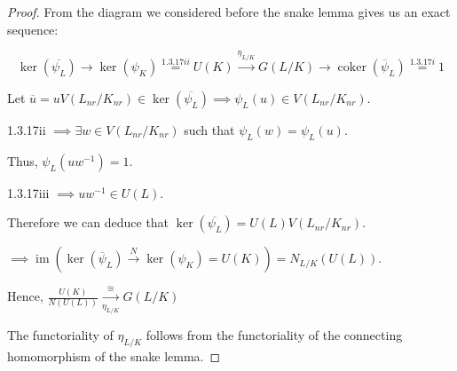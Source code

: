 \documentclass{article}
\theoremstyle{definition}
\numberwithin{theorem}{subsection}
\begin{document}
    \begin{proof}
        From the diagram we considered before the snake lemma gives us an exact sequence:

        \begin{center}
        \end{center}

        \[
            \ker(\overline{\psi_L}) \to \ker(\psi_K) \overset{1.3.17ii}{=} U(K) \xrightarrow{\eta_{L / K}} G(L / K) \to \operatorname{coker} (\overline{\psi}_L) \overset{1.3.17i}{=} 1
        \]

        Let \(\overline{u} = u V(L_{nr} / K_{nr}) \in \ker (\overline{\psi_L}) \implies \psi_L(u) \in V(L_{nr} / K_{nr})\).
        
        1.3.17ii \(\implies \exists w\in V(L_{nr} / K_{nr})\) such that \(\psi_L(w) = \psi_L(u)\).
        
        Thus, \(\psi_L(u w ^{-1}) = 1\).
        
        1.3.17iii \(\implies u w ^{-1} \in U(L)\).

        Therefore we can deduce that \(\ker(\overline{\psi_L}) = U(L) V(L_{nr} / K_{nr})\).
        
        \(\implies \operatorname{im} (\ker (\overline{\psi}_L) \xrightarrow{N} \ker (\psi_K) = U(K)) = N_{L / K}(U(L))\).
        
        Hence, \(\frac{U(K)}{N(U(L))} \xrightarrow[\eta_{L / K}]{\cong} G(L / K)\)
        
        The functoriality of \(\eta_{L / K}\) follows from the functoriality of the connecting homomorphism of the snake lemma.

    \end{proof}
\end{document}
